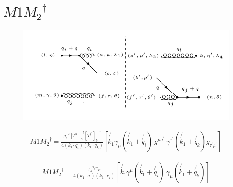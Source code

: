 \pagebreak

\section{$ M1{M_2}^{\dagger} $}
\begin{figure}[ht!]
\centering
\includegraphics[scale=0.7]{images/GQ/M1M2Dagger.png}
\end{figure}

\begin{equation}
\begin{split}
M1{M_2}^{\dagger}=\frac{{g_s}^2 {[T^{a}]_o}^{l} {[T^{f^{\prime}}]_{b^{\prime}}}^{n}}{4(k_1 \cdot q_i)(k_1 \cdot q_k)}[\not{k_1}{\gamma}_{\mu}(\not{k_1}+\not{q_i})\:g^{\mu \mu^{\prime}}\: {\gamma}^{{{\tau}^{\prime}}}(\not{k_1}+\not{q_k}) g_{\tau^{\prime} \mu^{\prime}}]
\end{split}
\end{equation}

\begin{equation}
\begin{split}
M1{M_2}^{\dagger}=\frac{{g_s}^2 C_F}{4(k_1 \cdot q_i)(k_1 \cdot q_k)}[\not{k_1}{\gamma}^{\mu}(\not{k_1}+\not{q_i})\: {\gamma}_{{{\mu}}}(\not{k_1}+\not{q_k})]
\end{split}
\end{equation}